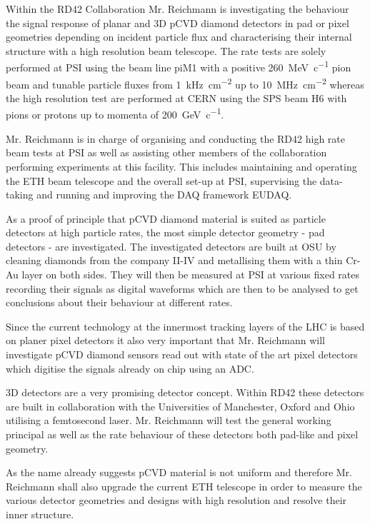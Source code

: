 
Within the RD42 Collaboration Mr. Reichmann is investigating the behaviour the signal response of planar and 3D \ac{pCVD} diamond detectors in pad or pixel geometries depending on incident particle flux and characterising their internal structure with a high resolution beam telescope. The rate tests are solely performed at \ac{PSI} using the beam line piM1 with a positive \SI{260}{\mega\electronvolt\per c} pion beam and tunable particle fluxes from \SI{1}{\kilo\hertz\per\centi\meter^2} up to \SI{10}{\mega\hertz\per\centi\meter^2} whereas the high resolution test are performed at CERN using the SPS beam H6 with pions or protons up to momenta of \SI{200}{\giga\electronvolt\per c}.\parsmall

Mr. Reichmann is in charge of organising and conducting the RD42 high rate beam tests at \ac{PSI} as well as assisting other members of the collaboration performing experiments at this facility. This includes maintaining and operating the ETH beam telescope and the overall set-up at \ac{PSI}, supervising the data-taking and running and improving the \ac{DAQ} framework EUDAQ.\parsmall

As a proof of principle that \ac{pCVD} diamond material is suited as particle detectors at high particle rates, the most simple detector geometry - pad detectors - are investigated. The investigated detectors are built at \ac{OSU} by cleaning diamonds from the company II-IV and metallising them with a thin Cr-Au layer on both sides. They will then be measured at \ac{PSI} at various fixed rates recording their signals as digital waveforms which are then to be analysed to get conclusions about their behaviour at different rates.\parsmall

Since the current technology at the innermost tracking layers of the LHC is based on planer pixel detectors it also very important that Mr. Reichmann will investigate \ac{pCVD} diamond sensors read out with state of the art pixel detectors which digitise the signals already on chip using an \ac{ADC}. \parsmall

3D detectors are a very promising detector concept. Within RD42 these detectors are built in collaboration with the Universities of Manchester, Oxford and Ohio utilising a femtosecond laser. Mr. Reichmann will test the general working principal as well as the rate behaviour of these detectors both pad-like and pixel geometry.\parsmall

As the name already suggests \ac{pCVD} material is not uniform and therefore Mr. Reichmann shall also upgrade the current ETH telescope in order to measure the various detector geometries and designs with high resolution and resolve their inner structure.\parend
